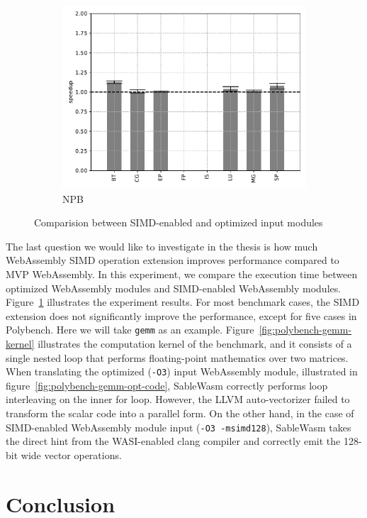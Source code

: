 \begin{figure}
\begin{subfigure}[t]{.45\textwidth}
        \includegraphics[width=\textwidth]{Images/6.3.RQ3/npb-simd-speedup}
        \caption{NPB}
    \end{subfigure}
    \caption{Comparision between SIMD-enabled and optimized input modules}
    \label{fig:rq3}
\end{figure}

The last question we would like to investigate in the thesis is how much WebAssembly SIMD operation extension improves performance compared to MVP WebAssembly. In this experiment, we compare the execution time between optimized WebAssembly modules and SIMD-enabled WebAssembly modules. Figure~\ref{fig:rq3} illustrates the experiment results. For most benchmark cases, the SIMD extension does not significantly improve the performance, except for five cases in Polybench. Here we will take \texttt{gemm} as an example. Figure~\ref{fig:polybench-gemm-kernel} illustrates the computation kernel of the benchmark, and it consists of a single nested loop that performs floating-point mathematics over two matrices. When translating the optimized (\texttt{-O3}) input WebAssembly module, illustrated in figure~\ref{fig:polybench-gemm-opt-code}, SableWasm correctly performs loop interleaving on the inner for loop. However, the LLVM auto-vectorizer failed to transform the scalar code into a parallel form. On the other hand, in the case of SIMD-enabled WebAssembly module input (\texttt{-O3 -msimd128}), SableWasm takes the direct hint from the WASI-enabled clang compiler and correctly emit the 128-bit wide vector operations.

\section*{Conclusion}

